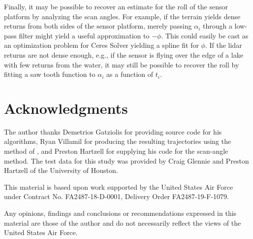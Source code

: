 \documentclass
[rmp,reprint,
twocolumn,amsmath,showkeys,letterpaper,raggedbottom]{revtex4-2}
\begin{document}
Finally, it may be possible to recover an estimate for the roll of the
sensor platform by analyzing the scan angles.  For example, if the
terrain yields dense returns from both sides of the sensor platform,
merely passing $\alpha_i$ through a low-pass filter might yield a useful
approximation to $-\phi$.  This could easily be cast as an optimization
problem for Ceres Solver yielding a spline fit for $\phi$.  If the lidar
returns are not dense enough, e.g., if the sensor is flying over the
edge of a lake with few returns from the water, it may still be possible
to recover the roll by fitting a saw tooth function to $\alpha_i$ as a
function of $t_i$.

\section*{Acknowledgments}

The author thanks Demetrios Gatziolis for providing source code for his
algorithms, Ryan Villamil for producing the resulting trajectories using
the method of \citet{gatziolis19}, and Preston Hartzell for supplying
his code for the scan-angle method.  The test data for this study was
provided by Craig Glennie and Preston Hartzell of the University of
Houston.

This material is based upon work supported by the United States Air
Force under Contract No. FA2487-18-D-0001, Delivery Order
FA2487-19-F-1079.

Any opinions, findings and conclusions or recommendations expressed in
this material are those of the author and do not necessarily reflect the
views of the United States Air Force.


\end{document}
